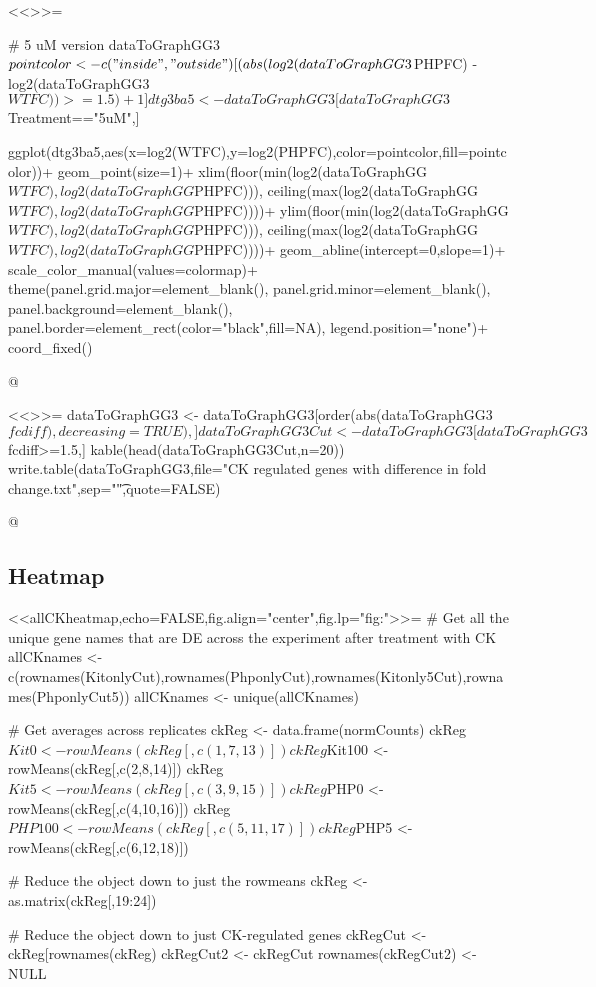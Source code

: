 \documentclass{article}
\begin{document}
{{{{<<>>=
	
# 5 uM version
dataToGraphGG3$pointcolor <- c("inside","outside")[(abs(log2(dataToGraphGG3$PHPFC) - log2(dataToGraphGG3$WTFC))>=1.5)+1]

dtg3ba5 <- dataToGraphGG3[dataToGraphGG3$Treatment=="5uM",]

ggplot(dtg3ba5,aes(x=log2(WTFC),y=log2(PHPFC),color=pointcolor,fill=pointcolor))+
	geom_point(size=1)+
	xlim(floor(min(log2(dataToGraphGG$WTFC),log2(dataToGraphGG$PHPFC))),
		ceiling(max(log2(dataToGraphGG$WTFC),log2(dataToGraphGG$PHPFC))))+
	ylim(floor(min(log2(dataToGraphGG$WTFC),log2(dataToGraphGG$PHPFC))),
		ceiling(max(log2(dataToGraphGG$WTFC),log2(dataToGraphGG$PHPFC))))+
	geom_abline(intercept=0,slope=1)+
	scale_color_manual(values=colormap)+
	theme(panel.grid.major=element_blank(),
		panel.grid.minor=element_blank(),
		panel.background=element_blank(),
		panel.border=element_rect(color="black",fill=NA),
		legend.position="none")+
	coord_fixed()


@

<<>>=
dataToGraphGG3 <- dataToGraphGG3[order(abs(dataToGraphGG3$fcdiff),decreasing=TRUE),]
dataToGraphGG3Cut <- dataToGraphGG3[dataToGraphGG3$fcdiff>=1.5,]
kable(head(dataToGraphGG3Cut,n=20))
write.table(dataToGraphGG3,file="CK regulated genes with difference in fold change.txt",sep="\t",quote=FALSE)

@

\subsection{Heatmap}

<<allCKheatmap,echo=FALSE,fig.align="center",fig.lp="fig:">>=
# Get all the unique gene names that are DE across the experiment after treatment with CK
allCKnames <- c(rownames(KitonlyCut),rownames(PhponlyCut),rownames(Kitonly5Cut),rownames(PhponlyCut5))
allCKnames <- unique(allCKnames)

# Get averages across replicates
ckReg <- data.frame(normCounts)
ckReg$Kit0 <- rowMeans(ckReg[,c(1,7,13)])
ckReg$Kit100 <- rowMeans(ckReg[,c(2,8,14)])
ckReg$Kit5 <- rowMeans(ckReg[,c(3,9,15)])
ckReg$PHP0 <- rowMeans(ckReg[,c(4,10,16)])
ckReg$PHP100 <- rowMeans(ckReg[,c(5,11,17)])
ckReg$PHP5 <- rowMeans(ckReg[,c(6,12,18)])

# Reduce the object down to just the rowmeans
ckReg <- as.matrix(ckReg[,19:24])

# Reduce the object down to just CK-regulated genes
ckRegCut <- ckReg[rownames(ckReg) %
ckRegCut2 <- ckRegCut
rownames(ckRegCut2) <- NULL

}}}}
\end{document}
